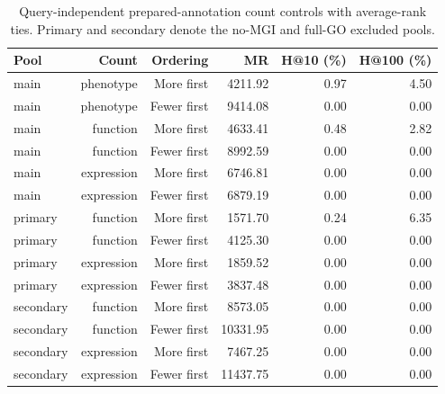\begin{table}[tb]
\centering\small
\caption{Query-independent prepared-annotation count controls with average-rank ties. Primary and secondary denote the no-MGI and full-GO excluded pools.}
\label{tab:count_controls}
\begin{tabular}{lrrrrr}
\toprule
Pool & Count & Ordering & MR & H@10 (\%) & H@100 (\%) \\
\midrule
main & phenotype & More first & 4211.92 & 0.97 & 4.50 \\
main & phenotype & Fewer first & 9414.08 & 0.00 & 0.00 \\
main & function & More first & 4633.41 & 0.48 & 2.82 \\
main & function & Fewer first & 8992.59 & 0.00 & 0.00 \\
main & expression & More first & 6746.81 & 0.00 & 0.00 \\
main & expression & Fewer first & 6879.19 & 0.00 & 0.00 \\
primary & function & More first & 1571.70 & 0.24 & 6.35 \\
primary & function & Fewer first & 4125.30 & 0.00 & 0.00 \\
primary & expression & More first & 1859.52 & 0.00 & 0.00 \\
primary & expression & Fewer first & 3837.48 & 0.00 & 0.00 \\
secondary & function & More first & 8573.05 & 0.00 & 0.00 \\
secondary & function & Fewer first & 10331.95 & 0.00 & 0.00 \\
secondary & expression & More first & 7467.25 & 0.00 & 0.00 \\
secondary & expression & Fewer first & 11437.75 & 0.00 & 0.00 \\
\bottomrule
\end{tabular}
\end{table}
